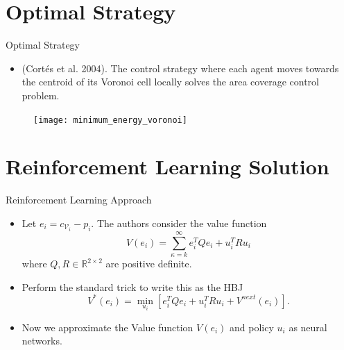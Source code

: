 \documentclass[9pt]{beamer}
\newcommand{\R}{\mathbb{R}}
\newcommand{\V}{\mathcal{V}}
\begin{document}
\section{Optimal Strategy}
\begin{frame}{Optimal Strategy}
	\begin{itemize}
		\item (Cort\'es et al. 2004). The control strategy where each agent moves towards the centroid of its Voronoi cell locally solves the area coverage control problem. 
	\end{itemize}
	\begin{figure}[H]
		\centering 
		\texttt{[image: minimum\_energy\_voronoi]}
	\end{figure}
\end{frame}

\section{Reinforcement Learning Solution}
\begin{frame}{Reinforcement Learning Approach}
	\begin{itemize}
		\item Let $e_i = c_{\V_i} - p_i$. The authors consider the value function 
		\begin{equation*}
			\displaystyle V(e_i) = \sum\limits_{\kappa = k}^{\infty}{e_i^TQe_i + u_i^TRu_i}
		\end{equation*}
		where $Q, R \in \R^{2 \times 2}$ are positive definite.
		\item Perform the standard trick to write this as the HBJ 
		\begin{equation*}
			\displaystyle V^*(e_i) = \min\limits_{u_i}{\left[ e_i^TQe_i + u_i^TRu_i+ V^{next}(e_i) \right]}.
		\end{equation*} 
		\item Now we approximate the Value function $V(e_i)$ and policy $u_i$ as neural networks.  
	\end{itemize}
\end{frame}
\end{document}
